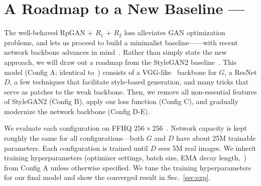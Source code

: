 

\section{A Roadmap to a New Baseline --- \modelName}
\label{sec:roadmap}



The well-behaved RpGAN + $R_1$ + $R_2$ loss alleviates GAN optimization problems, and lets us proceed to build a minimalist baseline---\modelName---with recent network backbone advances in mind~\cite{convnext,metaformer}. Rather than simply state the new approach, we will draw out a roadmap from the StyleGAN2 baseline~\cite{sg2ada}. This model (Config A; identical to~\cite{sg2ada}) consists of a VGG-like~\cite{vgg} backbone for $G$, a ResNet $D$, a few techniques that facilitate style-based generation, and many tricks that serve as patches to the weak backbone. Then, we remove all non-essential features of StyleGAN2 (Config B), apply our loss function (Config C), and gradually modernize the network backbone (Config D-E).


We evaluate each configuration on FFHQ $256\times256$~\cite{sg1}. Network capacity is kept roughly the same for all configurations---both $G$ and $D$ have about 25M trainable parameters. Each configuration is trained until $D$ sees 5M real images. We inherit training hyperparameters (optimizer settings, batch size, EMA decay length,~\etc) from Config A unless otherwise specified. We tune the training hyperparameters for our final model and show the converged result in Sec.~\ref{sec:exp}.


